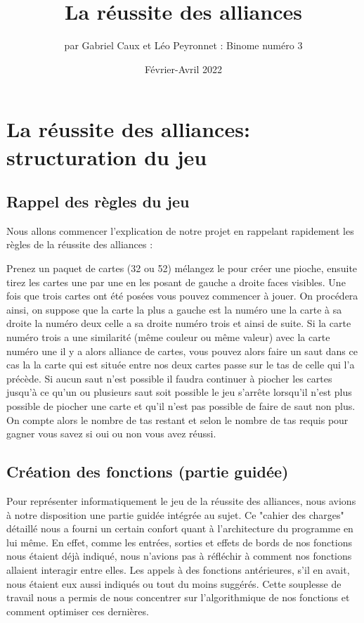 \documentclass[10pt,a4paper,french,titlepage]{article}
\author{par Gabriel Caux et Léo Peyronnet : Binome numéro 3}
\title{La réussite des alliances}
\date{Février-Avril 2022}
\begin{document}
\maketitle
\tableofcontents
\section{La réussite des alliances: structuration du jeu}
\subsection{Rappel des règles du jeu}
Nous allons commencer l'explication de notre projet en rappelant rapidement les règles de la réussite des alliances :

Prenez un paquet de cartes (32 ou 52) mélangez le pour créer une pioche, ensuite tirez les cartes une par une en les posant de gauche a droite faces visibles. Une fois que trois cartes ont été posées vous pouvez commencer à jouer. On procédera ainsi, on suppose que la carte la plus a gauche est la numéro une la carte à sa droite la numéro deux celle a sa droite numéro trois et ainsi de suite. Si la carte numéro trois a une similarité (même couleur ou même valeur) avec la carte numéro une il y a alors alliance de cartes, vous pouvez alors faire un saut dans ce cas la la carte qui est située entre nos deux cartes passe sur le tas de celle qui l'a précède. Si aucun saut n'est possible il faudra continuer à piocher les cartes jusqu'à ce qu'un ou plusieurs saut soit possible le jeu s'arrête lorsqu'il n'est plus possible de piocher une carte et qu'il n'est pas possible de faire de saut non plus. On compte alors le nombre de tas restant et selon le nombre de tas requis pour gagner vous savez si oui ou non vous avez réussi.

\subsection{Création des fonctions (partie guidée)}
Pour représenter informatiquement le jeu de la réussite des alliances, nous avions à notre disposition une partie guidée intégrée au sujet.
Ce "cahier des charges" détaillé nous a fourni un certain confort quant à l'architecture du programme en lui même. En effet, comme les entrées, 
sorties et effets de bords de nos fonctions nous étaient déjà indiqué, nous n'avions pas à réfléchir à comment nos fonctions allaient interagir entre elles. Les appels à des fonctions antérieures, s'il en avait, nous étaient eux aussi indiqués ou tout du moins suggérés. Cette souplesse de travail nous
a permis de nous concentrer sur l'algorithmique de nos fonctions et comment optimiser ces dernières.\\
\end{document}
